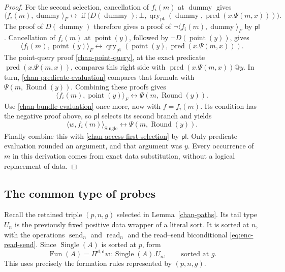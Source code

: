 \begin{proof}
For the second selection, cancellation of $f_i(m)$ at
$\operatorname{dummy}$ gives
\[
 \langle f_i(m),\operatorname{dummy}\rangle_F
 \leftrightarrow
 \operatorname{if}\bigl(D(\operatorname{dummy});\bot,
       \operatorname{qry}_{\operatorname{pt}}
          (\operatorname{dummy},\operatorname{pred}(x.\Psi(m,x)))\bigr).
\]
The proof of $D(\operatorname{dummy})$ therefore gives a proof of
$\neg\langle f_i(m),\operatorname{dummy}\rangle_F$ by $\mathsf{pl}$.
Cancellation of $f_i(m)$ at $\operatorname{point}(y)$, followed by
$\neg D(\operatorname{point}(y))$, gives
\[
 \langle f_i(m),\operatorname{point}(y)\rangle_F
 \leftrightarrow
 \operatorname{qry}_{\operatorname{pt}}
       (\operatorname{point}(y),\operatorname{pred}(x.\Psi(m,x))).
\]
The point-query proof \eqref{chan-point-query}, at the exact predicate
$\operatorname{pred}(x.\Psi(m,x))$, compares this right side with
$\operatorname{pred}(x.\Psi(m,x))@y$.  In turn,
\eqref{chan-predicate-evaluation} compares that formula with
$\Psi(m,\operatorname{Round}(y))$.  Combining these proofs gives
\[
 \langle f_i(m),\operatorname{point}(y)\rangle_F
        \leftrightarrow\Psi(m,\operatorname{Round}(y)).
\]
Use \eqref{chan-bundle-evaluation} once more, now with $f=f_i(m)$.  Its
condition has the negative proof above, so $\mathsf{pl}$ selects its
second branch and yields
\[
 \langle w,f_i(m)\rangle_{\operatorname{Single}}
        \leftrightarrow\Psi(m,\operatorname{Round}(y)).
\]
Finally combine this with \eqref{chan-access-first-selection} by
$\mathsf{pl}$.  Only predicate evaluation rounded an argument, and that
argument was $y$.  Every occurrence of $m$ in this derivation comes from
exact data substitution, without a logical replacement of data.
\end{proof}

\subsection{The common type of probes}

Recall the retained triple $(p,n,g)$ selected in
Lemma~\ref{chan-paths}.  Its tail type $U_n$ is the previously fixed
positive data wrapper of a literal sort.  It is sorted at $n$, with the
operations $\operatorname{send}_n$ and $\operatorname{read}_n$ and the
read--send biconditional \eqref{eq:enc-read-send}.  Since
$\operatorname{Single}(A)$ is sorted at $p$, form
\begin{equation}
 \operatorname{Fun}(A)
    =\Pi^{\mathsf d,\mathsf d}w:\operatorname{Single}(A).U_n,
 \qquad\text{sorted at }g.
\label{chan-fun}
\end{equation}
This uses precisely the formation rules represented by $(p,n,g)$.

